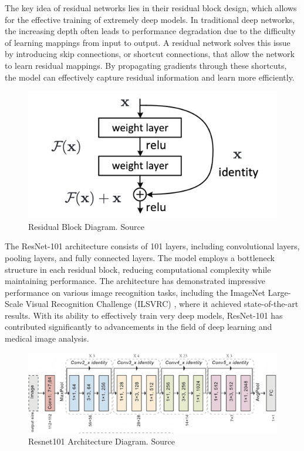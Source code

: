 The key idea of residual networks lies in their residual block design, which allows for the effective training of extremely deep models. In traditional deep networks, the increasing depth often leads to performance degradation due to the difficulty of learning mappings from input to output. A residual network solves this issue by introducing skip connections, or shortcut connections, that allow the network to learn residual mappings. By propagating gradients through these shortcuts, the model can effectively capture residual information and learn more efficiently.

\begin{figure}
\centering
\includegraphics[width=13cm]{images/blackboxes/res_block.png}
\caption{Residual Block Diagram. Source \cite{resnet101}}
\end{figure}

The ResNet-101 architecture consists of 101 layers, including convolutional layers, pooling layers, and fully connected layers. The model employs a bottleneck structure in each residual block, reducing computational complexity while maintaining performance. The architecture has demonstrated impressive performance on various image recognition tasks, including the ImageNet Large-Scale Visual Recognition Challenge (ILSVRC) \cite{imageNet}, where it achieved state-of-the-art results.  With its ability to effectively train very deep models, ResNet-101 has contributed significantly to advancements in the field of deep learning and medical image analysis.

\begin{figure}
\centering
\includegraphics[width=13cm]{images/blackboxes/resnet101.png}
\caption{Resnet101 Architecture Diagram. Source \cite{resnet101Diagram}}
\end{figure}


